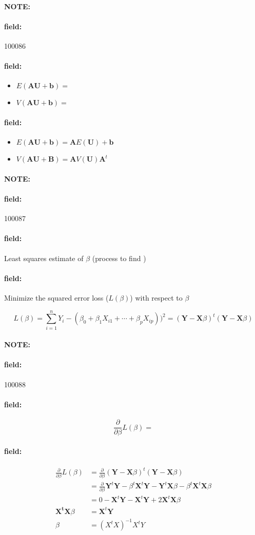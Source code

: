 \documentclass[12pt]{article}
\newenvironment{note}{\paragraph{NOTE:}}{}
\newenvironment{field}{\paragraph{field:}}{}
\begin{document}
\begin{note} \begin{field} \tiny 100086 \end{field}
 \begin{field}
  \begin{itemize}
   \item $E(\textbf{AU} + \textbf{b}) = $
   \item $V(\mathbf{AU + \mathbf{b}}) = $
  \end{itemize}
 \end{field}
 \begin{field}
  \begin{itemize}
   \item $E(\textbf{AU} + \textbf{b}) = \mathbf{A} E(\mathbf{U}) + \mathbf{b}$
   \item $V(\mathbf{AU + \mathbf{B}}) = \mathbf{A}V(\mathbf{U}) \mathbf{A}^t$
  \end{itemize}
 \end{field}
\end{note}


\begin{note} \begin{field} \tiny 100087 \end{field}
 \begin{field}
  Least squares estimate of $\beta$ (process to find )
 \end{field}
 \begin{field}
  Minimize the squared error loss ($L(\beta)$) with respect to $\beta$

  $$ L(\beta ) = \sum_{i=1}^n Y_i - (\beta_0 + \beta_1 X_{i1} + \cdots + \beta_p X_{ip}))^2 = (\mathbf{Y} - \mathbf{X}\beta)^t(\mathbf{Y} - \mathbf{X}\beta)$$
 \end{field}
\end{note}

\begin{note} \begin{field} \tiny 100088 \end{field}
 \begin{field}
  $$  \frac{\partial}{\partial \beta} L(\beta) = $$
 \end{field}
 \begin{field}
  \begin{align*}
   \frac{\partial}{\partial \beta} L(\beta) & = \frac{\partial}{\partial \beta} (\mathbf{Y} - \mathbf{X}\beta)^t(\mathbf{Y} - \mathbf{X}\beta) \\
                                            & = \frac{\partial}{\partial \beta}  \mathbf{Y}^t \mathbf{Y} - \beta^t \mathbf{X}^t
   \textbf{Y} - \mathbf{Y}^t \mathbf{X}\beta - \beta^t \mathbf{X}^t \mathbf{X} \beta                                                           \\
                                            & = 0 - \mathbf{X}^t \mathbf{Y} - \mathbf{X}^t \mathbf{Y} + 2 \mathbf{X}^t \mathbf{X} \beta        \\
   \mathbf{X^t}\mathbf{X}\beta &= \mathbf{X}^t \mathbf{Y}\\
   \beta &= (X^tX)^{-1}X^tY
  \end{align*}
 \end{field}
\end{note}
\end{document}
